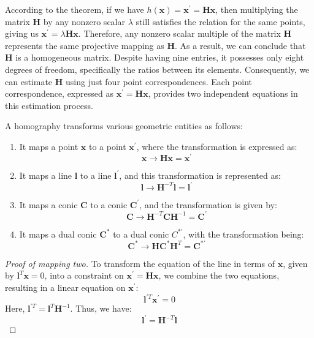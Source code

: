 According to the theorem, if we have $h(\mathbf{x})=\mathbf{x}^\prime=\mathbf{Hx}$, then multiplying the matrix $\mathbf{H}$ by any nonzero scalar $\lambda$ still satisfies the relation for the same points, giving us $\mathbf{x}^\prime=\lambda \mathbf{Hx}$. 
Therefore, any nonzero scalar multiple of the matrix $\mathbf{H}$ represents the same projective mapping as $\mathbf{H}$.
As a result, we can conclude that $\mathbf{H}$ is a homogeneous matrix.
Despite having nine entries, it possesses only eight degrees of freedom, specifically the ratios between its elements. 
Consequently, we can estimate $\mathbf{H}$ using just four point correspondences.
Each point correspondence, expressed as $\mathbf{x}^\prime=\mathbf{Hx}$, provides two independent equations in this estimation process.
\begin{definition}
    A homography transforms various geometric entities as follows:
\end{definition}
\begin{enumerate}
    \item It maps a point $\mathbf{x}$ to a point $\mathbf{x}^\prime$, where the transformation is expressed as: 
        \[\mathbf{x} \rightarrow \mathbf{Hx}=\mathbf{x}^\prime\]
    \item It maps a line $\mathbf{l}$ to a line $\mathbf{l}^\prime$, and this transformation is represented as: 
        \[\mathbf{l} \rightarrow \mathbf{H}^{-T} \mathbf{l}=\mathbf{l}^\prime\]
    \item It maps a conic $\mathbf{C}$ to a conic $\mathbf{C}^\prime$, and the transformation is given by: 
        \[\mathbf{C} \rightarrow \mathbf{H}^{-T} \mathbf{CH}^{-1}=\mathbf{C}^\prime\]
    \item It maps a dual conic $\mathbf{C}^\ast$ to a dual conic $C^{\ast\prime}$, with the transformation being: 
        \[\mathbf{C}^\ast \rightarrow \mathbf{HC}^\ast \mathbf{H}^{T}=\mathbf{C}^{\ast\prime}\]
\end{enumerate}
\begin{proof}[Proof of mapping two]
    To transform the equation of the line in terms of $\mathbf{x}$, given by $\mathbf{l}^T\mathbf{x}=0$, into a constraint on $\mathbf{x}^\prime=\mathbf{Hx}$, we combine the two equations, resulting in a linear equation on $\mathbf{x}^\prime$: 
    \[\mathbf{l}^{\prime T}\mathbf{x}^\prime=0\]
    Here, $\mathbf{l}^{\prime T}=\mathbf{l}^{T}\mathbf{H}^{-1}$. 
    Thus, we have:
    \[\mathbf{l}^\prime=\mathbf{H}^{-T}\mathbf{l}\]
\end{proof}
